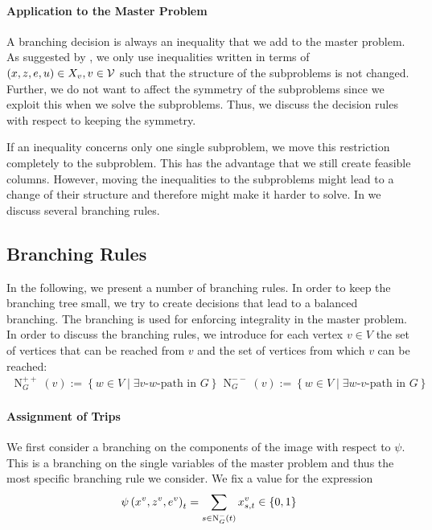 \paragraph{Application to the Master Problem} \parfill

A branching decision is always an inequality that we add to the master problem. As suggested by \cite{Kaiser}, we only use inequalities written in terms of ${(x,z,e,u)\in X_v}, {v\in\mathcal{V}}$ such that the structure of the subproblems is not changed. Further, we do not want to affect the symmetry of the subproblems since we exploit this when we solve the subproblems. Thus, we discuss the decision rules with respect to keeping the symmetry.

If an inequality concerns only one single subproblem, we move this restriction completely to the subproblem. This has the advantage that we still create feasible columns. However, moving the inequalities to the subproblems might lead to a change of their structure and therefore might make it harder to solve. In  we discuss several branching rules.


\subsection{Branching Rules}
\label{sec:branching_rules}

In the following, we present a number of branching rules. In order to keep the branching tree small, we try to create decisions that lead to a balanced branching. The branching is used for enforcing integrality in the master problem. In order to discuss the branching rules, we introduce for each vertex $v\in V$ the set of vertices that can be reached from $v$ and the set of vertices from which $v$ can be reached:
\begin{align*}
	\operatorname{N}_G^{++}(v) := \left\{w\in V\mid\exists v \text{-} w \text{-path in } G\right\} && \operatorname{N}_G^{--}(v) := \left\{w\in V\mid\exists w \text{-} v \text{-path in } G\right\}
\end{align*}

\paragraph{Assignment of Trips} \parfill

We first consider a branching on the components of the image with respect to $\psi$. This is a branching on the single variables of the master problem and thus the most specific branching rule we consider. We fix a value for the expression
\begin{align*}
	\psi\left(x^v,z^v,e^v\right)_t = \sum_{s\in\operatorname{N}_G^-(t)} x^v_{s,t} \in\left\{0,1\right\}
\end{align*}

